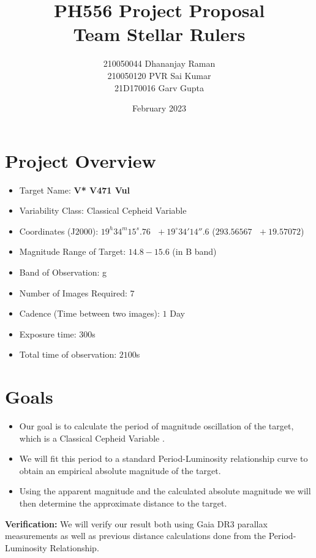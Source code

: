 \documentclass[12pt]{article}
\title{PH556 Project Proposal\\Team Stellar Rulers}
\author{210050044 Dhananjay Raman\\210050120 PVR Sai Kumar\\21D170016 Garv Gupta}
\date{February 2023}
\begin{document}
\maketitle
\tableofcontents
\section{Project Overview}
\begin{itemize}
    \item Target Name: \textbf{V* V471 Vul}
    \item Variability Class: Classical Cepheid Variable
    \item Coordinates (J$2000$): $19^h 34^m 15^s.76\text{ }+19^\circ 34' 14''.6$ ($293.56567\text{ }+19.57072$) \cite{vsx}
    \item Magnitude Range of Target: $14.8 - 15.6$ (in B band) \cite{vsx}
    \item Band of Observation: g
    \item Number of Images Required: $7$
    \item Cadence (Time between two images): $1$ Day
    \item Exposure time: $300$s
    \item Total time of observation: $2100$s
\end{itemize}
\section{Goals}
\begin{itemize}
    \item Our goal is to calculate the period of magnitude oscillation of the target, which is a Classical Cepheid Variable \cite{vsx}.
    \item We will fit this period to a standard Period-Luminosity relationship curve \cite{plrelation} to obtain an empirical absolute magnitude of the target.
    \item Using the apparent magnitude and the calculated absolute magnitude we will then determine the approximate distance to the target.
\end{itemize}
\textbf{Verification:} We will verify our result both using Gaia DR3 \cite{gaia} parallax measurements as well as previous distance calculations \cite{simbad} done from the Period-Luminosity Relationship.
\end{document}
